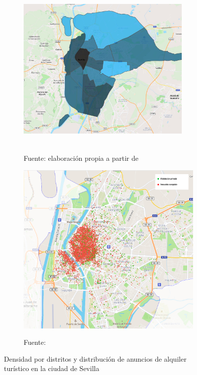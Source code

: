 \documentclass[a4paper,10pt]{article}
\begin{document}
            \clearpage
            \begin{figure}[ht]
                \begin{subfigure}{0.5\textwidth}
                    \includegraphics[width = 8.5cm, height = 8.08cm]{graphics/sevilledensity_map.jpeg}
                    \begin{flushleft}
                        \footnotesize{Fuente: elaboración propia a partir de \cite[(1)]{insideairbnb}}
                    \end{flushleft}
                \end{subfigure}
                \begin{subfigure}{0.5\textwidth}
                    \includegraphics[scale = 0.4]{graphics/cap_sevilledensity_distribution_map.jpg}
                    \begin{flushleft}
                        \footnotesize{Fuente: \ \cite[(3)]{insideairbnb}}\\
                    \end{flushleft}
                \end{subfigure}
                \caption{Densidad por distritos y distribución de anuncios de alquiler turístico en la ciudad de Sevilla}
                

\end{figure}
\end{document}
